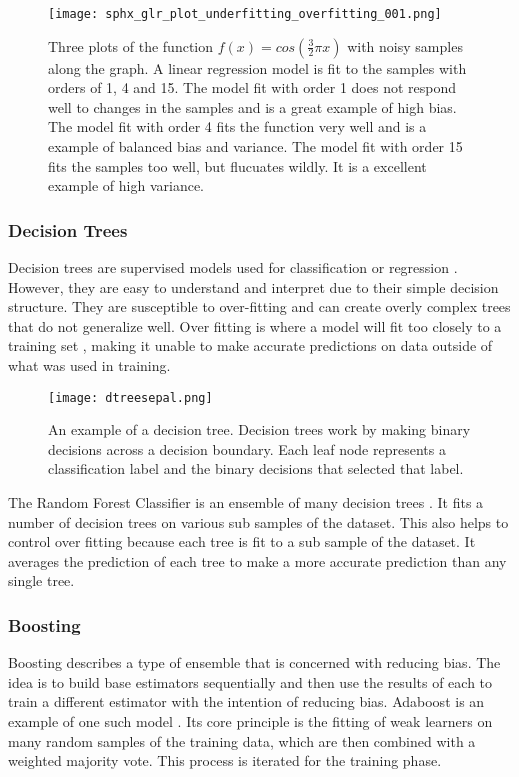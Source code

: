 \begin{figure}[htp]
    \centering
    \texttt{[image: sphx\_glr\_plot\_underfitting\_overfitting\_001.png]}
    \caption{Three plots of the function \( f(x) = cos(\frac{3}{2} \pi x)\) with noisy samples along the graph. 
    A linear regression model is fit to the samples with orders of 1, 4 and 15.
    The model fit with order 1 does not respond well to changes in the samples and is a great example of high bias.
    The model fit with order 4 fits the function very well and is a example of balanced bias and variance.
    The model fit with order 15 fits the samples too well, but flucuates wildly. 
    It is a excellent example of high variance.}
    \label{}
\end{figure}

\subsubsection{Decision Trees}
Decision trees are supervised models used for classification or regression \cite{breiman2017classification}.
However, they are easy to understand and interpret due to their simple decision structure. 
They are susceptible to over-fitting and can create overly complex trees that do not generalize well.
Over fitting is where a model will fit too closely to a training set \cite{cawley2010over}, making it unable to make accurate predictions on data outside of what was used in training.

\begin{figure}[htp]
    \centering
    \texttt{[image: dtreesepal.png]}
    \caption{An example of a decision tree.
    Decision trees work by making binary decisions across a decision boundary.
    Each leaf node represents a classification label and the binary decisions that selected that label.}
    \label{}
\end{figure}

\par
The Random Forest Classifier is an ensemble of many decision trees \cite{breiman2001random}.
It fits a number of decision trees on various sub samples of the dataset.
This also helps to control over fitting because each tree is fit to a sub sample of the dataset.
It averages the prediction of each tree to make a more accurate prediction than any single tree.


\subsubsection{Boosting}
Boosting describes a type of ensemble that is concerned with reducing bias.
The idea is to build base estimators sequentially and then use the results of each to train a different estimator with the intention of reducing bias.
Adaboost is an example of one such model \cite{freund1995desicion}.
Its core principle is the fitting of weak learners on many random samples of the training data, which are then combined with a weighted majority vote. 
This process is iterated for the training phase.



